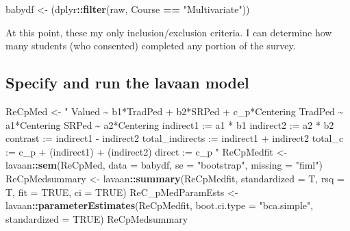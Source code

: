\documentclass[
  11pt,
]{book}
\newenvironment{Shaded}{\begin{snugshade}}{\end{snugshade}}
\newcommand{\AttributeTok}[1]{\textcolor[rgb]{0.27,0.27,0.27}{#1}}
\newcommand{\ConstantTok}[1]{\textcolor[rgb]{0.37,0.37,0.37}{#1}}
\newcommand{\FunctionTok}[1]{\textcolor[rgb]{0.27,0.27,0.27}{\textbf{#1}}}
\newcommand{\NormalTok}[1]{#1}
\newcommand{\OtherTok}[1]{\textcolor[rgb]{0.37,0.37,0.37}{#1}}
\newcommand{\SpecialCharTok}[1]{\textcolor[rgb]{0.43,0.43,0.43}{\textbf{#1}}}
\newcommand{\StringTok}[1]{\textcolor[rgb]{0.5,0.5,0.5}{#1}}
\begin{document}
\begin{Shaded}
\begin{Highlighting}[]
\NormalTok{babydf }\OtherTok{\textless{}{-}}\NormalTok{ (dplyr}\SpecialCharTok{::}\FunctionTok{filter}\NormalTok{(raw, Course }\SpecialCharTok{==} \StringTok{"Multivariate"}\NormalTok{))}
\end{Highlighting}
\end{Shaded}

At this point, these my only inclusion/exclusion criteria. I can determine how many students (who consented) completed any portion of the survey.

\hypertarget{specify-and-run-the-lavaan-model-1}{%
\subsection*{Specify and run the lavaan model}\label{specify-and-run-the-lavaan-model-1}}


\begin{Shaded}
\begin{Highlighting}[]
\NormalTok{ReCpMed }\OtherTok{\textless{}{-}} \StringTok{"}
\StringTok{          Valued \textasciitilde{} b1*TradPed + b2*SRPed + c\_p*Centering}
\StringTok{          TradPed \textasciitilde{} a1*Centering}
\StringTok{          SRPed \textasciitilde{} a2*Centering}
\StringTok{          }
\StringTok{          indirect1 := a1 * b1}
\StringTok{          indirect2 := a2 * b2}
\StringTok{          contrast := indirect1 {-} indirect2}
\StringTok{          total\_indirects := indirect1 + indirect2}
\StringTok{          total\_c    := c\_p + (indirect1) + (indirect2)}
\StringTok{          direct := c\_p}
\StringTok{          "}
\NormalTok{ReCpMedfit }\OtherTok{\textless{}{-}}\NormalTok{ lavaan}\SpecialCharTok{::}\FunctionTok{sem}\NormalTok{(ReCpMed, }\AttributeTok{data =}\NormalTok{ babydf, }\AttributeTok{se =} \StringTok{"bootstrap"}\NormalTok{, }\AttributeTok{missing =} \StringTok{"fiml"}\NormalTok{)}
\NormalTok{ReCpMedsummary }\OtherTok{\textless{}{-}}\NormalTok{ lavaan}\SpecialCharTok{::}\FunctionTok{summary}\NormalTok{(ReCpMedfit, }\AttributeTok{standardized =}\NormalTok{ T, }\AttributeTok{rsq =}\NormalTok{ T,}
    \AttributeTok{fit =} \ConstantTok{TRUE}\NormalTok{, }\AttributeTok{ci =} \ConstantTok{TRUE}\NormalTok{)}
\NormalTok{ReC\_pMedParamEsts }\OtherTok{\textless{}{-}}\NormalTok{ lavaan}\SpecialCharTok{::}\FunctionTok{parameterEstimates}\NormalTok{(ReCpMedfit, }\AttributeTok{boot.ci.type =} \StringTok{"bca.simple"}\NormalTok{,}
    \AttributeTok{standardized =} \ConstantTok{TRUE}\NormalTok{)}
\NormalTok{ReCpMedsummary}
\end{Highlighting}
\end{Shaded}
\end{document}
